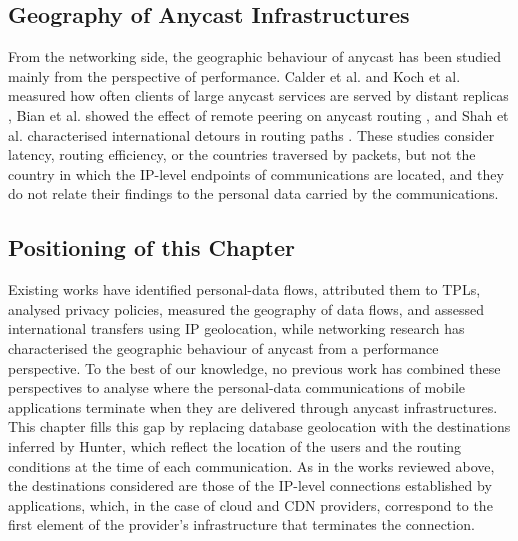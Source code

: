 \subsection{Geography of Anycast Infrastructures}
\label{sc:anycast_experiments_sota_anycast}

From the networking side, the geographic behaviour of anycast has been studied mainly from the perspective of performance. Calder et al. and Koch et al. measured how often clients of large anycast services are served by distant replicas \cite{Calder2015AnalyzingCDN, Koch2021AnycastSystems}, Bian et al. showed the effect of remote peering on anycast routing \cite{Bian2019TowardsPeering}, and Shah et al. characterised international detours in routing paths \cite{Shah2016TowardsDetours}. These studies consider latency, routing efficiency, or the countries traversed by packets, but not the country in which the IP-level endpoints of communications are located, and they do not relate their findings to the personal data carried by the communications.

\subsection{Positioning of this Chapter}
\label{sc:anycast_experiments_sota_positioning}

Existing works have identified personal-data flows, attributed them to TPLs, analysed privacy policies, measured the geography of data flows, and assessed international transfers using IP geolocation, while networking research has characterised the geographic behaviour of anycast from a performance perspective. To the best of our knowledge, no previous work has combined these perspectives to analyse where the personal-data communications of mobile applications terminate when they are delivered through anycast infrastructures. This chapter fills this gap by replacing database geolocation with the destinations inferred by Hunter, which reflect the location of the users and the routing conditions at the time of each communication. As in the works reviewed above, the destinations considered are those of the IP-level connections established by applications, which, in the case of cloud and CDN providers, correspond to the first element of the provider's infrastructure that terminates the connection.

